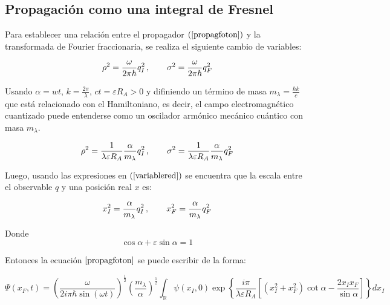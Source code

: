     \subsection{Propagación como una integral de Fresnel}
    
    Para establecer una relación entre el propagador $(\ref{propagfoton})$ y la transformada de Fourier fraccionaria, se realiza el siguiente cambio de variables:
    
    \begin{equation}
        \rho^{2} = \frac{\omega}{2 \pi \hbar} q_{I}^{2}\, ,\hspace{0.7cm}
        \sigma^{2} = \frac{\omega}{2 \pi \hbar} q_{F}^{2}
    \end{equation}
    
    Usando $\alpha = wt$, $k = \frac{2\pi}{\lambda}$, $ct=\varepsilon R_{A}>0$ y difiniendo un término de masa $m_{\lambda} = \frac{\hbar k}{c}$ que está relacionado con el Hamiltoniano, es decir, el campo electromagnético cuantizado puede entenderse como un oscilador armónico mecánico cuántico con masa $m_{\lambda}$.
    
    \begin{equation}
        \rho^{2} = \frac{1}{\lambda \varepsilon R_{A}} \frac{\alpha}{m_{\lambda}} q_{I}^{2}\, ,\hspace{0.7cm}
        \sigma^{2} = \frac{1}{\lambda \varepsilon R_{A}} \frac{\alpha}{m_{\lambda}}  q_{F}^{2}
    \end{equation}
    
    Luego, usando las expresiones en $(\ref{variablered})$ se encuentra que la escala entre el observable $q$ y una posición real $x$ es:
    
    \begin{equation}
        x_{I}^{2} = \frac{\alpha}{m_{\lambda}}q_{I}^{2} \, ,\hspace{0.7cm}
        x_{F}^{2} = \frac{\alpha}{m_{\lambda}}q_{F}^{2}
    \end{equation}
    
    Donde 
    \begin{equation}
        \cos \alpha + \varepsilon \sin \alpha = 1
        \label{eqcos}
    \end{equation}
    
    Entonces la ecuación $\ref{propagfoton}$ se puede escribir de la forma:
    
    \begin{equation}
        \Psi(x_{F},t) = \left ( \frac{\omega}{2i\pi \hbar \sin (\omega t)} \right )^{\frac{1}{2}}\left ( \frac{m_{\lambda}}{\alpha} \right ) ^{\frac{1}{2}} \int_{\mathbb{R}} \psi(x_{I},0) \exp \left \{ \frac{i\pi}{\lambda \varepsilon R_{A}} \left [ \left ( x_{I}^{2} + x_{F}^{2} \right ) \cot \alpha - \frac{2 x_{I} x_{F}}{\sin \alpha} \right ]\right \} dx_{I}
        \label{propagador3}
    \end{equation}
    
